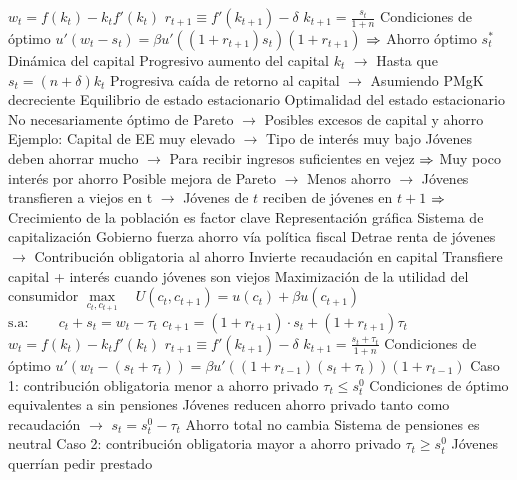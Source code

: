 \documentclass{nuevotema}
\begin{document}
\begin{esquemal}
				\4[] \quad \quad \quad \quad \quad $w_t = f(k_t) - k_t f'(k_t)$
				\4[] \quad \quad \quad \quad \quad $r_{t+1} \equiv f'(k_{t+1}) - \delta $
				\4[] \quad \quad \quad \quad \quad $k_{t+1} = \frac{s_t}{1+n}$
				\4 Condiciones de óptimo
				\4[] $u'(w_t -s_t) = \beta u'((1+r_{t+1})s_t)(1+r_{t+1})$
				\4[] $\Rightarrow$ Ahorro óptimo $s^*_t$
				\4 Dinámica del capital
				\4[] Progresivo aumento del capital $k_t$
				\4[] $\to$ Hasta que $s_t = (n+\delta)k_t$
				\4[] Progresiva caída de retorno al capital
				\4[] $\to$ Asumiendo PMgK decreciente
				\4[] Equilibrio de estado estacionario
				\4 Optimalidad del estado estacionario
				\4[] No necesariamente óptimo de Pareto
				\4[] $\to$ Posibles excesos de capital y ahorro
				\4[] Ejemplo:
				\4[] Capital de EE muy elevado
				\4[] $\to$ Tipo de interés muy bajo
				\4[] Jóvenes deben ahorrar mucho
				\4[] $\to$ Para recibir ingresos suficientes en vejez
				\4[] $\Rightarrow$ Muy poco interés por ahorro
				\4[] Posible mejora de Pareto
				\4[] $\to$ Menos ahorro
				\4[] $\to$ Jóvenes transfieren a viejos en t
				\4[] $\to$ Jóvenes de $t$ reciben de jóvenes en $t+1$
				\4[] $\Rightarrow$ Crecimiento de la población es factor clave
				\4 Representación gráfica
				\4[] 
			\3 Sistema de capitalización
				\4 Gobierno fuerza ahorro vía política fiscal
				\4[] Detrae renta de jóvenes
				\4[] $\to$ Contribución obligatoria al ahorro
				\4[] Invierte recaudación en capital
				\4[] Transfiere capital + interés cuando jóvenes son viejos
				\4 Maximización de la utilidad del consumidor
				\4[] $\underset{c_{t}, c_{t+1}}{\max} \quad U(c_{t}, c_{t+1}) = u(c_{t})+\beta u(c_{t+1})$
				\4[] \quad $\text{s.a}: \quad \quad c_{t} + s_t = w_t - \tau_t$
				\4[] \quad \quad \quad \quad \quad $c_{t+1}=(1+r_{t+1}) \cdot s_t + (1+r_{t+1}) \tau_t$
				\4[] \quad \quad \quad \quad \quad $w_t = f(k_t) - k_t f'(k_t)$
				\4[] \quad \quad \quad \quad \quad $r_{t+1} \equiv f'(k_{t+1}) - \delta$
				\4[] \quad \quad \quad \quad \quad $k_{t+1} = \frac{s_t + \tau_t}{1+n}$
				\4 Condiciones de óptimo
				\4[] $u'(w_t - (s_t+\tau_t)) = \beta u'((1+r_{t-1})(s_t+\tau_t))(1+r_{t-1})$
				\4 Caso 1: contribución obligatoria menor a ahorro privado
				\4[] $\tau_t \leq s_t^0$
				\4[] Condiciones de óptimo equivalentes a sin pensiones
				\4[] Jóvenes reducen ahorro privado tanto como recaudación
				\4[] $\to$ $s_t = s_t^0 - \tau_t$
				\4[] Ahorro total no cambia
				\4[] Sistema de pensiones es neutral
				\4 Caso 2: contribución obligatoria mayor a ahorro privado
				\4[] $\tau_t \geq s_t^0$
				\4[] Jóvenes querrían pedir prestado

\end{esquemal}
\end{document}

